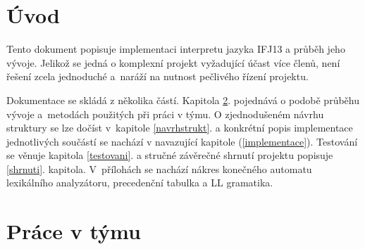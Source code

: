 \documentclass[12pt,a4paper,titlepage,final]{article}
\begin{document}

\def\authorA{Horký Lukáš}
\def\loginA{xhorky21}
\def\authorB{Hurta Marek}
\def\loginB{xhurta01}
\def\authorC{Huták Lukáš}
\def\loginC{xhutak01}
\def\authorD{Kozubík Michal}
\def\loginD{xkozub03}
\def\authorE{Lietavcová Zuzana}
\def\loginE{xlieta00}
\def\projname{Implementace interpretu imperativního jazyka IFJ13}



\pagestyle{plain}
\setcounter{page}{1}
\tableofcontents

\newpage
\pagestyle{plain}
\setcounter{page}{1}

\section{Úvod} \label{uvod}

Tento dokument popisuje implementaci interpretu jazyka IFJ13 a průběh jeho
vývoje. Jelikož se jedná o komplexní projekt vyžadující účast více členů, není
řešení zcela jednoduché a~naráží na nutnost pečlivého řízení projektu. 

Dokumentace se skládá z několika částí. Kapitola \ref{tym}. pojednává o podobě 
průběhu vývoje a~metodách použitých při práci v týmu. O zjednodušeném návrhu 
struktury se lze dočíst v~kapitole \ref{navrhstrukt}. a konkrétní popis 
implementace jednotlivých součástí se nachází v navazující 
kapitole (\ref{implementace}). Testování se věnuje kapitola \ref{testovani}. a 
stručné závěrečné shrnutí projektu popisuje \ref{shrnuti}. kapitola. 
V~přílohách se nachází nákres konečného automatu lexikálního analyzátoru, 
precedenční tabulka a LL gramatika.

\section{Práce v týmu} \label{tym}
\end{document}
